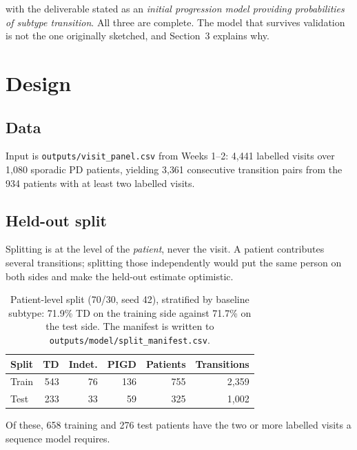 \documentclass[11pt,a4paper]{article}
\newcommand{\code}[1]{\texttt{\small #1}}
\begin{document}
\noindent
with the deliverable stated as an \emph{initial progression model providing
probabilities of subtype transition}. All three are complete. The model that
survives validation is not the one originally sketched, and Section~3 explains
why.

\section{Design}

\subsection{Data}

Input is \code{outputs/visit\_panel.csv} from Weeks 1--2: 4{,}441 labelled
visits over 1{,}080 sporadic PD patients, yielding 3{,}361 consecutive
transition pairs from the 934 patients with at least two labelled visits.

\subsection{Held-out split}

Splitting is at the level of the \emph{patient}, never the visit. A patient
contributes several transitions; splitting those independently would put the
same person on both sides and make the held-out estimate optimistic.

\begin{table}[htbp]
\centering
\begin{tabular}{@{}lrrrrr@{}}
\toprule
\textbf{Split} & \textbf{TD} & \textbf{Indet.} & \textbf{PIGD} & \textbf{Patients} & \textbf{Transitions} \\
\midrule
Train & 543 & 76 & 136 & 755 & 2{,}359 \\
Test  & 233 & 33 &  59 & 325 & 1{,}002 \\
\bottomrule
\end{tabular}
\caption{Patient-level split (70/30, seed 42), stratified by baseline subtype:
71.9\% TD on the training side against 71.7\% on the test side. The manifest is
written to \code{outputs/model/split\_manifest.csv}.}
\end{table}

\noindent
Of these, 658 training and 276 test patients have the two or more labelled
visits a sequence model requires.
\end{document}
